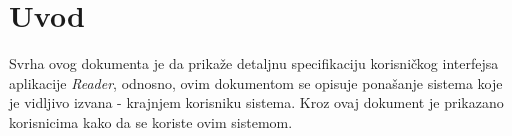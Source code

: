 \chapter{Uvod}

Svrha ovog dokumenta je da prikaže detaljnu specifikaciju korisničkog interfejsa aplikacije \textit{Reader}, odnosno, ovim dokumentom se opisuje ponašanje sistema koje je vidljivo izvana - krajnjem korisniku sistema. Kroz ovaj dokument je prikazano korisnicima kako da se koriste ovim sistemom.